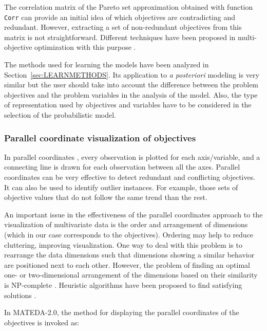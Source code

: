 \documentclass[a4paper]{article}
\begin{document}
The correlation matrix of the Pareto set approximation obtained with
function \texttt{Corr} can provide an initial idea of which
objectives are contradicting and redundant. However, extracting a
set of non-redundant objectives from this matrix is not
straightforward. Different techniques have been proposed in
multi-objective optimization with this purpose  \cite{Brockhoff_and_Zitzler:2006,Deb_and_Saxena:2005,Lopez_et_al:2008,Purshouse_and_Fleming:2003}.

The methods used for learning the models have been analyzed in
Section~\ref{sec:LEARNMETHODS}. Its application to \emph{a
posteriori} modeling is very similar but the user should take into
account the difference between the problem objectives and the
problem variables in the analysis of the model. Also, the type of
representation used by objectives and variables have to be
considered in the selection of the probabilistic model.

\subsubsection{Parallel coordinate visualization of objectives}
\label{sec:ParCoord}

In parallel coordinates \cite{Inselberg:2009}, every observation is
plotted for each axis/variable,
  and a connecting line is drawn for each observation between all the
  axes. Parallel coordinates can be very effective to detect
  redundant and conflicting objectives. It can also be used to identify
  outlier instances. For example, those sets of objective values
  that do not follow the same trend than the rest.

    An important issue in the effectiveness of the parallel coordinates approach to the visualization
  of multivariate data is the order and arrangement of dimensions (which in our case corresponds to the objectives). Ordering may help to reduce cluttering,
improving  visualization.   One way to deal with this problem is to
rearrange the data dimensions such that dimensions showing a similar
   behavior are positioned next to each other. However, the problem of finding an optimal one- or two-dimensional
     arrangement of the dimensions based on their similarity is NP-complete \cite{Ankerst_et_al:1998}.
Heuristic algorithms have been proposed to find satisfying solutions
\cite{Ankerst_et_al:1998}.

In MATEDA-2.0, the method for displaying the parallel coordinates of
the objectives is invoked as:
\end{document}
